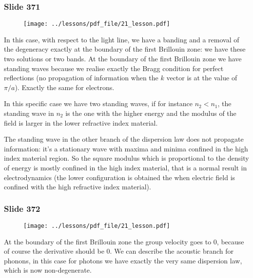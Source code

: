 \documentclass[../main/main.tex]{subfiles}
\begin{document}
\newpage

\subsubsection{Slide 371}

\begin{figure}[h!]
\centering
\texttt{[image: ../lessons/pdf\_file/21\_lesson.pdf]}
\end{figure}

In this case, with respect to the light line, we have a banding and a removal of the degeneracy exactly at the boundary of the first Brillouin zone: we have these two solutions or two bands.
At the boundary of the first Brillouin zone we have standing waves because we realise exactly the Bragg condition for perfect reflections (no propagation of information when the $k$ vector is at the value of $\pi /a$).
Exactly the same for electrons.

In this specific case we have two standing waves, if for instance $n_2 < n_1$, the standing wave in $n_2$ is the one with the higher energy and the modulus of the field is larger in the lower refractive index material.

The standing wave in the other branch of the dispersion law does not propagate information: it’s a stationary wave with maxima and minima confined in the high index material region.
So the square modulus which is proportional to the density of energy is mostly confined in the high index material, that is a normal result in electrodynamics (the lower configuration is obtained the when electric field is confined with the high refractive index material).

\newpage
\subsubsection{Slide 372}

\begin{figure}[h!]
\centering
\texttt{[image: ../lessons/pdf\_file/21\_lesson.pdf]}
\end{figure}

At the boundary of the first Brillouin zone the group velocity goes to 0, because of course the derivative should be 0.
We can describe the acoustic branch for phonons, in this case for photons we have exactly the very same dispersion law, which is now non-degenerate.

\newpage
\end{document}
